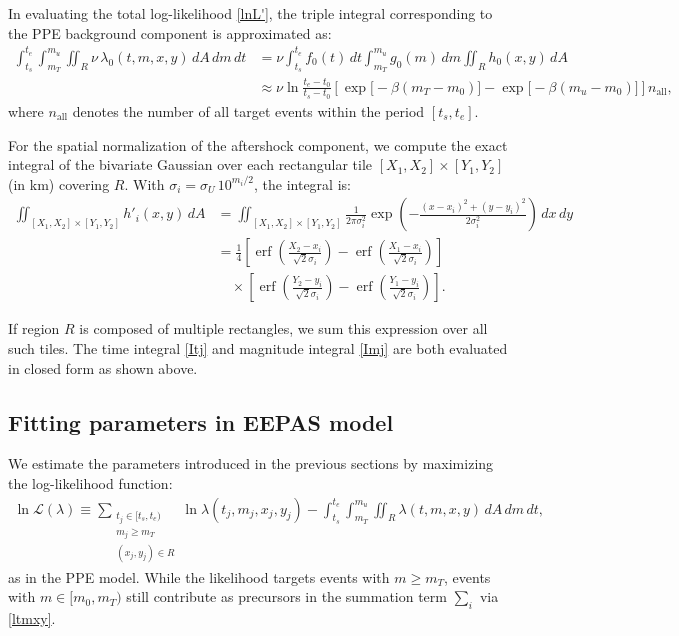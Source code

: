 \documentclass[linenum,doublespace,onecolumn]{SSA-SRL}
\theoremstyle{lemma}
\begin{document}
In evaluating the total log-likelihood \eqref{lnL'}, the triple integral corresponding to the PPE background component is approximated as:
\begin{equation*}
\begin{aligned}
\int_{t_s}^{t_e} \int_{m_T}^{m_u} \iint_R \nu\, \lambda_0(t, m, x, y)\, dA\, dm\, dt 
&= \nu \int_{t_s}^{t_e} f_0(t)\, dt \int_{m_T}^{m_u} g_0(m)\, dm \iint_R h_0(x, y)\, dA \\
&\approx \nu \ln \frac{t_e - t_0}{t_s - t_0} \left[ \exp\!\big[-\beta(m_T - m_0)\big] - \exp\!\big[-\beta(m_u - m_0)\big] \right] n_{\text{all}},
\end{aligned}
\end{equation*}
where $n_{\text{all}}$ denotes the number of all target events within the period $[t_s, t_e]$.

For the spatial normalization of the aftershock component, we compute the exact integral of the bivariate Gaussian over each rectangular tile $[X_1, X_2] \times [Y_1, Y_2]$ (in km) covering $R$. With $\sigma_i = \sigma_U\, 10^{m_i/2}$, the integral is:
\begin{equation*}
\begin{aligned}
\iint_{[X_1, X_2] \times [Y_1, Y_2]} h'_i(x, y)\, dA 
&= \iint_{[X_1, X_2] \times [Y_1, Y_2]} \frac{1}{2\pi \sigma_i^2} \exp\!\left( -\frac{(x - x_i)^2 + (y - y_i)^2}{2\sigma_i^2} \right)\, dx\, dy \\
&= \frac{1}{4} \left[ \operatorname{erf}\!\left( \frac{X_2 - x_i}{\sqrt{2} \sigma_i} \right) - \operatorname{erf}\!\left( \frac{X_1 - x_i}{\sqrt{2} \sigma_i} \right) \right] \\
&\quad \times \left[ \operatorname{erf}\!\left( \frac{Y_2 - y_i}{\sqrt{2} \sigma_i} \right) - \operatorname{erf}\!\left( \frac{Y_1 - y_i}{\sqrt{2} \sigma_i} \right) \right].
\end{aligned}
\end{equation*}

If region $R$ is composed of multiple rectangles, we sum this expression over all such tiles. The time integral \eqref{Itj} and magnitude integral \eqref{Imj} are both evaluated in closed form as shown above.


\subsection{Fitting parameters in EEPAS model}

We estimate the parameters introduced in the previous sections by maximizing the log-likelihood function:
\begin{equation}\label{lnL}
\begin{aligned}
\ln{\mathcal{L}(\lambda)} \equiv \sum_{\substack{t_j \in [t_s, t_e)\\ m_j \ge m_T\\ (x_j, y_j) \in R}} \ln{\lambda(t_j, m_j, x_j, y_j)} 
- \int_{t_s}^{t_e} \int_{m_T}^{m_u} \iint_{R} \lambda(t, m, x, y)\, dA\, dm\, dt,
\end{aligned}
\end{equation}
as in the PPE model. While the likelihood targets events with $m \ge m_T$, events with $m \in [m_0, m_T)$ still contribute as precursors in the summation term $\sum_i$ via \eqref{ltmxy}.
\end{document}
